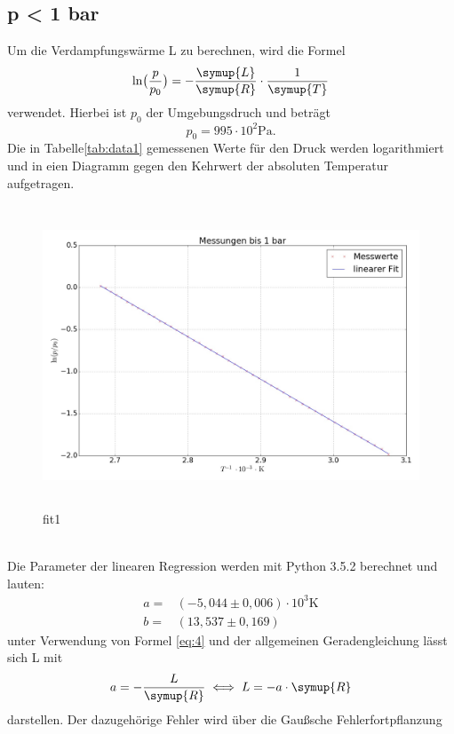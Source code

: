 \subsection{p < 1 bar}
Um die Verdampfungswärme L zu berechnen, wird die Formel
\begin{equation*}
  \ln \bigl(\frac{p}{p_0}\bigr)=-\frac{\symup{L}}{\symup{R}} \cdot \frac{1}{\symup{T}}
\end{equation*}
verwendet. Hierbei ist $p_0$ der Umgebungsdruch und beträgt
\begin{equation*}
  p_0=995\cdot 10^2 \si{\pascal}.
\end{equation*}
Die in Tabelle\ref{tab:data1} gemessenen Werte für den Druck werden logarithmiert und in eien
Diagramm gegen den Kehrwert der absoluten Temperatur aufgetragen. \\
 
\begin{figure}
  \centering
  \includegraphics[height=9cm , width=13.5cm]{fit1.jpg}
  \caption{fit1}
  \label{fig:fit1}
  \end{figure}
  \\
Die Parameter der linearen Regression werden mit Python 3.5.2 berechnet und
lauten:
\begin{align*}
  a =& (-5,044 \pm 0,006) \cdot 10^3 \si{\kelvin} \\
  b =& (13,537 \pm 0,169)
\end{align*}
unter Verwendung von Formel \eqref{eq:4} und der allgemeinen Geradengleichung
lässt sich L mit
\begin{equation}
  a=-\frac{L}{\symup{R}} \iff L = -a \cdot \symup{R}
\end{equation}
darstellen. Der dazugehörige Fehler wird über die Gaußsche Fehlerfortpflanzung
